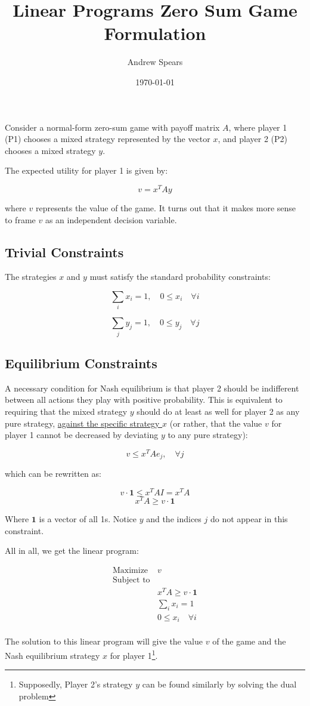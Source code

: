 \documentclass[a4paper,12pt]{article}
\title{Linear Programs Zero Sum Game Formulation}
\author{Andrew Spears}
\date{\today}
\begin{document}
\maketitle

Consider a normal-form zero-sum game with payoff matrix \( A \), where player 1 (P1) chooses a mixed strategy represented by the vector \( x \), and player 2 (P2) chooses a mixed strategy \( y \).

The expected utility for player 1 is given by:

\[
v = x^T A y
\]

where \( v \) represents the value of the game. It turns out that it makes more sense to frame $v$ as an independent decision variable.

\subsection*{Trivial Constraints}

The strategies \( x \) and \( y \) must satisfy the standard probability constraints:

\[
\sum_i x_i = 1, \quad 0 \leq x_i \quad \forall i
\]

\[
\sum_j y_j = 1, \quad 0 \leq y_j \quad \forall j
\]



\subsection*{Equilibrium Constraints}

A necessary condition for Nash equilibrium is that player 2 should be indifferent between all actions they play with positive probability. This is equivalent to requiring that the mixed strategy \( y \) should do at least as well for player 2 as any pure strategy, \underline{against the specific strategy \( x \)} (or rather, that the value $v$ for player 1 cannot be decreased by deviating $y$ to any pure strategy):

\[
v \leq x^T A e_j, \quad \forall j
\]

which can be rewritten as:

\[
v \cdot \mathbf{1} \leq x^T A I = x^T A
\]
\[ x^T A \geq v \cdot \mathbf{1} \]

Where $\mathbf{1}$ is a vector of all 1s.
Notice $y$ and the indices $j$ do not appear in this constraint.

All in all, we get the linear program:

\begin{align*}
\text{Maximize } & v \\
\text{Subject to} \\
& x^TA \geq v \cdot \mathbf{1} \\
& \sum_i x_i = 1 \\
& 0 \leq x_i \quad \forall i \\
\end{align*}

The solution to this linear program will give the value \( v \) of the game and the Nash equilibrium strategy \( x \) for player 1\footnote{Supposedly, Player 2's strategy \( y \) can be found similarly by solving the dual problem}. 
\end{document}

